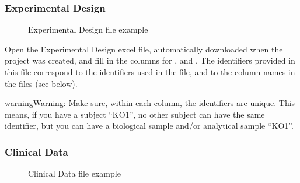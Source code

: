 \documentclass[letterpaper,10pt,english]{sphinxmanual}
\begin{document}
\subsubsection{Experimental Design}
\label{\detokenize{getting_started/upload-data:experimental-design}}\label{\detokenize{getting_started/upload-data:id1}}
\begin{figure}[htbp]
\centering
\capstart

\noindent{}
\caption{Experimental Design file example}\label{\detokenize{getting_started/upload-data:id3}}\end{figure}

Open the Experimental Design excel file, automatically downloaded when the project was created, and fill in the columns for ,  and .
The identifiers provided in this file  correspond to the identifiers used in the  file, and to the column names in the  files (see below).

\begin{sphinxadmonition}{warning}{Warning:}
Make sure, within each column, the identifiers are unique. This means, if you have a subject “KO1”, no other subject can have the same identifier, but you can have a biological sample and/or analytical sample “KO1”.
\end{sphinxadmonition}


\subsubsection{Clinical Data}
\label{\detokenize{getting_started/upload-data:clinical-data}}
\begin{figure}[htbp]
\centering
\capstart

\noindent{}
\caption{Clinical Data file example}\label{\detokenize{getting_started/upload-data:id4}}\end{figure}
\end{document}
